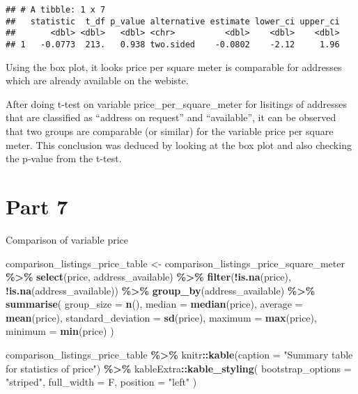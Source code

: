 \documentclass[
]{article}
\newenvironment{Shaded}{\begin{snugshade}}{\end{snugshade}}
\newcommand{\AttributeTok}[1]{\textcolor[rgb]{0.13,0.29,0.53}{#1}}
\newcommand{\FunctionTok}[1]{\textcolor[rgb]{0.13,0.29,0.53}{\textbf{#1}}}
\newcommand{\NormalTok}[1]{#1}
\newcommand{\OtherTok}[1]{\textcolor[rgb]{0.56,0.35,0.01}{#1}}
\newcommand{\SpecialCharTok}[1]{\textcolor[rgb]{0.81,0.36,0.00}{\textbf{#1}}}
\newcommand{\StringTok}[1]{\textcolor[rgb]{0.31,0.60,0.02}{#1}}
\begin{document}
\begin{verbatim}
## # A tibble: 1 x 7
##   statistic  t_df p_value alternative estimate lower_ci upper_ci
##       <dbl> <dbl>   <dbl> <chr>          <dbl>    <dbl>    <dbl>
## 1   -0.0773  213.   0.938 two.sided    -0.0802    -2.12     1.96
\end{verbatim}

Using the box plot, it looks price per square meter is comparable for
addresses which are already available on the webiste.

After doing t-test on variable price\_per\_square\_meter for lisitings
of addresses that are classified as ``address on request'' and
``available'', it can be observed that two groups are comparable (or
similar) for the variable price per square meter. This conclusion was
deduced by looking at the box plot and also checking the p-value from
the t-test.

\hypertarget{part-7}{%
\section{Part 7}\label{part-7}}

Comparison of variable price

\begin{Shaded}
\begin{Highlighting}[]
\NormalTok{comparison\_listings\_price\_table }\OtherTok{\textless{}{-}}
\NormalTok{  comparison\_listings\_price\_square\_meter }\SpecialCharTok{\%\textgreater{}\%}
  \FunctionTok{select}\NormalTok{(price, address\_available) }\SpecialCharTok{\%\textgreater{}\%}
  \FunctionTok{filter}\NormalTok{(}\SpecialCharTok{!}\FunctionTok{is.na}\NormalTok{(price), }\SpecialCharTok{!}\FunctionTok{is.na}\NormalTok{(address\_available)) }\SpecialCharTok{\%\textgreater{}\%}
  \FunctionTok{group\_by}\NormalTok{(address\_available) }\SpecialCharTok{\%\textgreater{}\%}
  \FunctionTok{summarise}\NormalTok{(}
    \AttributeTok{group\_size =} \FunctionTok{n}\NormalTok{(),}
    \AttributeTok{median =} \FunctionTok{median}\NormalTok{(price),}
    \AttributeTok{average =} \FunctionTok{mean}\NormalTok{(price),}
    \AttributeTok{standard\_deviation =} \FunctionTok{sd}\NormalTok{(price),}
    \AttributeTok{maximum =} \FunctionTok{max}\NormalTok{(price),}
    \AttributeTok{minimum =} \FunctionTok{min}\NormalTok{(price)}
\NormalTok{  )}

\NormalTok{comparison\_listings\_price\_table }\SpecialCharTok{\%\textgreater{}\%}
\NormalTok{  knitr}\SpecialCharTok{::}\FunctionTok{kable}\NormalTok{(}\AttributeTok{caption =} \StringTok{"Summary table for statistics of price"}\NormalTok{) }\SpecialCharTok{\%\textgreater{}\%}
\NormalTok{  kableExtra}\SpecialCharTok{::}\FunctionTok{kable\_styling}\NormalTok{(}
    \AttributeTok{bootstrap\_options =} \StringTok{"striped"}\NormalTok{,}
    \AttributeTok{full\_width =}\NormalTok{ F,}
    \AttributeTok{position =} \StringTok{"left"}
\NormalTok{  )}
\end{Highlighting}
\end{Shaded}
\end{document}
